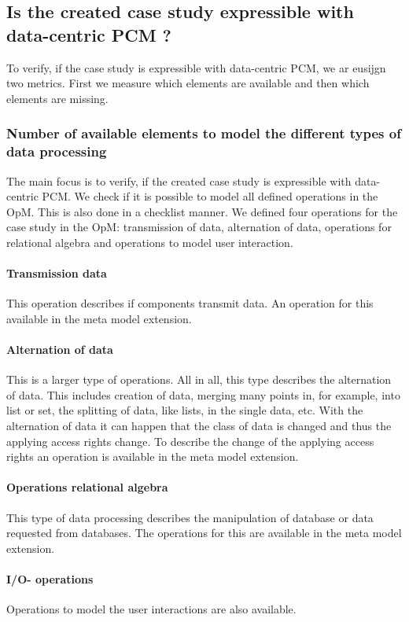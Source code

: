 \subsection{Is the created case study expressible with data-centric PCM ?}
To verify, if the case study is expressible with data-centric PCM, we ar eusijgn two metrics. First we measure which elements are available and then which elements are missing.
\subsubsection{Number of available elements to model the different types of data processing}
The main focus is to verify, if the created case study is expressible with data-centric PCM. We check if it is possible to model all defined operations in the OpM. %
This is also done in a checklist manner.
We defined four operations for the case study in the OpM: transmission of data, alternation of data, operations for relational algebra and operations to model user interaction. 

\paragraph{Transmission data}
This operation describes if components transmit data. An operation for this available in the meta model extension.

\paragraph{Alternation of data}
This is a larger type of operations. All in all, this type describes the alternation of data. This includes
creation of data, merging many points in, for example, into list or set, the splitting of data, like lists, in the single data, etc. With the alternation of data it can happen that the class of data is changed and thus the applying access rights change. To describe the change of the applying access rights an operation is available in the meta model extension. 

\paragraph{Operations relational algebra}
This type of data processing describes the manipulation of database or data requested from databases. The operations for this are available in the meta model extension. 

\paragraph{I/O- operations}
Operations to model the user interactions are also available.

